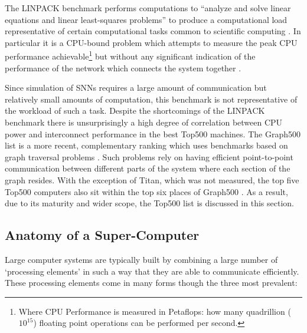 		The LINPACK benchmark performs computations to ``analyze and solve linear
		equations and linear least-squares problems'' to produce a computational
		load representative of certain computational tasks common to scientific
		computing \cite{dongarra84}. In particular it is a CPU-bound problem which
		attempts to measure the peak CPU performance achievable\footnote{Where CPU
		Performance is measured in Petaflops: how many quadrillion ($10^{15}$)
		floating point operations can be performed per second.} but without any
		significant indication of the performance of the network which connects the
		system together \cite{dongarra07}.
		
		Since simulation of SNNs requires a large amount of communication but
		relatively small amounts of computation, this benchmark is not
		representative of the workload of such a task. Despite the shortcomings of
		the LINPACK benchmark there is unsurprisingly a high degree of correlation
		between CPU power and interconnect performance in the best Top500 machines.
		The Graph500 list is a more recent, complementary ranking which uses
		benchmarks based on graph traversal problems \cite{murphy10}. Such problems
		rely on having efficient point-to-point communication between different
		parts of the system where each section of the graph resides. With the
		exception of Titan, which was not measured, the top five Top500 computers
		also sit within the top six places of Graph500 \cite{murphy13}. As a
		result, due to its maturity and wider scope, the Top500 list is discussed in
		this section.
		
		\subsection{Anatomy of a Super-Computer}
			
			
			Large computer systems are typically built by combining a large number of
			`processing elements' in such a way that they are able to communicate
			efficiently. These processing elements come in many forms though the three
			most prevalent:
			

